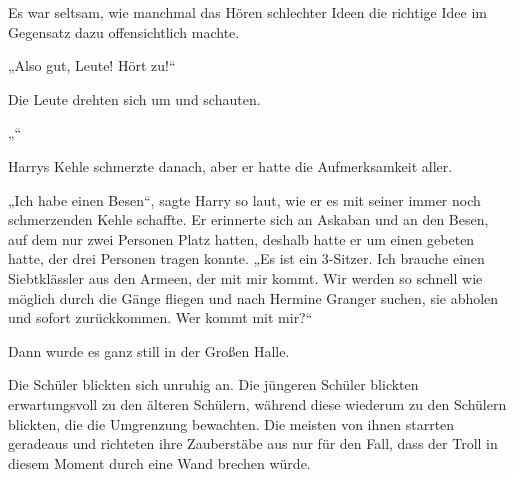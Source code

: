 Es war seltsam, wie manchmal das Hören schlechter Ideen die richtige Idee im Gegensatz dazu offensichtlich machte.

„Also gut, Leute! Hört zu!“

Die Leute drehten sich um und schauten.

„“

Harrys Kehle schmerzte danach, aber er hatte die Aufmerksamkeit aller.

„Ich habe einen Besen“, sagte Harry so laut, wie er es mit seiner immer noch schmerzenden Kehle schaffte. Er erinnerte sich an Askaban und an den Besen, auf dem nur zwei Personen Platz hatten, deshalb hatte er um einen gebeten hatte, der drei Personen tragen konnte. „Es ist ein 3-Sitzer. Ich brauche einen Siebtklässler aus den Armeen, der mit mir kommt. Wir werden so schnell wie möglich durch die Gänge fliegen und nach Hermine Granger suchen, sie abholen und sofort zurückkommen. Wer kommt mit mir?“

Dann wurde es ganz still in der Großen Halle.

\later

Die Schüler blickten sich unruhig an. Die jüngeren Schüler blickten erwartungsvoll zu den älteren Schülern, während diese wiederum zu den Schülern blickten, die die Umgrenzung bewachten. Die meisten von ihnen starrten geradeaus und richteten ihre Zauberstäbe aus nur für den Fall, dass der Troll in diesem Moment durch eine Wand brechen würde.

